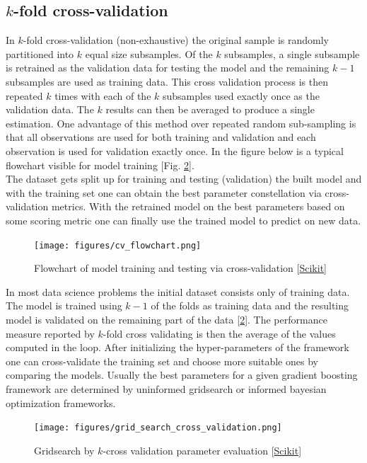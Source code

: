 \documentclass[12pt, a4paper]{article}
\begin{document}
\subsection{$k$-fold cross-validation}
In $k$-fold cross-validation (non-exhaustive) the original sample is randomly partitioned into $k$ equal size subsamples.
Of the $k$ subsamples, a single subsample is retrained as the validation data for testing the model and the remaining $k - 1$ subsamples are used as training data. This cross validation process is then repeated $k$ times with each of the $k$ subsamples used exactly once as the validation data. The $k$ results can then be averaged to produce a single estimation. One advantage of this method over repeated random sub-sampling is that all observations are used for both training and validation and each observation is used for validation exactly once. In the figure below is a typical flowchart visible for model training [Fig. \ref{fig: cv_flowchart}]. \\
The dataset gets split up for training and testing (validation) the built model and with the training set one can obtain the best parameter constellation via cross-validation metrics. With the retrained model on the best parameters based on some scoring metric one can finally use the trained model to predict on new data.
\begin{figure}[!htpb]
    \centering
    \texttt{[image: figures/cv\_flowchart.png]}
    \caption[Flowchart of model training]{Flowchart of model training and testing via cross-validation [\href{https://scikit-learn.org/stable/modules/cross_validation.html}{Scikit}]}
    \label{fig: cv_flowchart}    
\end{figure}
In most data science problems the initial dataset consists only of training data. The model is trained using $k - 1$ of the folds as training data and the resulting model is validated on the remaining part of the data [\ref{fig: cv_flowchart}].
The performance measure reported by $k$-fold cross validating is then the average of the values computed in the loop. 
After initializing the hyper-parameters of the framework one can cross-validate the training set and choose more suitable ones by comparing the models.
Usually the best parameters for a given gradient boosting framework are determined by uninformed gridsearch or informed bayesian optimization frameworks.
\begin{figure}[!htpb]
    \centering
    \texttt{[image: figures/grid\_search\_cross\_validation.png]}
    \caption[Gridsearch by cross validation parameter evaluation]{Gridsearch by $k$-cross validation parameter evaluation [\href{https://scikit-learn.org/stable/modules/cross_validation.html}{Scikit}]}
    \label{fig: cv_flowchart}    
\end{figure}
\end{document}
